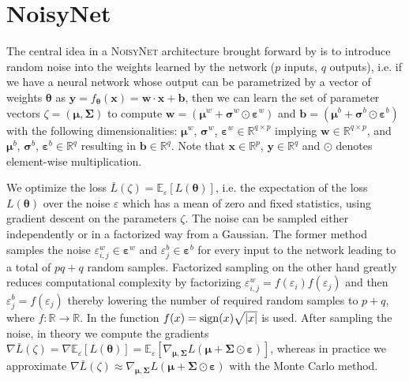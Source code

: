 \clearpage
\hypertarget{link-noisynet}{\section{NoisyNet}}

\noindent The central idea in a \textsc{NoisyNet} architecture brought forward by \cite{noisynet-paper} is to introduce random noise into the weights learned by the network ($p$ inputs, $q$ outputs), i.e. if we have a neural network whose output can be parametrized by a vector of weights $\boldsymbol{\theta}$ as $\textbf{y} = f_{\boldsymbol{\theta}}(\textbf{x}) = \textbf{w} \cdot \textbf{x} + \textbf{b}$, then we can learn the set of parameter vectors $\zeta = (\boldsymbol{\mu}, \boldsymbol{\Sigma})$ to compute $\textbf{w} = (\boldsymbol{\mu}^{w} + \boldsymbol{\sigma}^{w} \odot \boldsymbol{\varepsilon}^{w})$ and $\textbf{b} = (\boldsymbol{\mu}^{b} + \boldsymbol{\sigma}^{b} \odot \boldsymbol{\varepsilon}^{b})$ with the following dimensionalities: $\boldsymbol{\mu}^{w}$, $\boldsymbol{\sigma}^{w}$, $\boldsymbol{\varepsilon}^{w} \in \mathbb{R}^{q \times p}$ implying $\textbf{w} \in \mathbb{R}^{q \times p}$, and $\boldsymbol{\mu}^{b}$, $\boldsymbol{\sigma}^{b}$, $\boldsymbol{\varepsilon}^{b} \in \mathbb{R}^{q}$ resulting in $\textbf{b} \in \mathbb{R}^{q}$. Note that $\textbf{x} \in \mathbb{R}^{p}$, $\textbf{y} \in \mathbb{R}^{q}$ and $\odot$ denotes element-wise multiplication.

\noindent We optimize the loss $\bar{L}(\zeta) = \mathbb{E}_{\varepsilon}[L(\boldsymbol{\theta})]$, i.e. the expectation of the loss $L(\boldsymbol{\theta})$ over the noise $\varepsilon$ which has a mean of zero and fixed statistics, using gradient descent on the parameters $\zeta$. The noise can be sampled either independently or in a factorized way from a Gaussian. The former method samples the noise $\varepsilon^{w}_{i,j} \in \boldsymbol{\varepsilon}^{w}$ and $\varepsilon^{b}_{j} \in \boldsymbol{\varepsilon}^{b}$ for every input to the network leading to a total of $pq + q$ random samples. Factorized sampling on the other hand greatly reduces computational complexity by factorizing $\varepsilon^{w}_{i,j} = f(\varepsilon_{i}) f(\varepsilon_{j})$ and then $\varepsilon^{b}_{j} = f(\varepsilon_{j})$ thereby lowering the number of required random samples to $p + q$, where $f: \mathbb{R} \rightarrow \mathbb{R}$. In \cite{noisynet-paper} the function $f(x) = \operatorname{sign}(x) \sqrt{|x|}$ is used. After sampling the noise, in theory we compute the gradients $\nabla\bar{L}(\zeta) = \nabla\mathbb{E}_{\varepsilon}[L(\boldsymbol{\theta})] = \mathbb{E}_{\varepsilon}[\nabla_{\boldsymbol{\mu}, \boldsymbol{\Sigma}}L(\boldsymbol{\mu} + \boldsymbol{\Sigma} \odot \boldsymbol{\varepsilon})]$, whereas in practice we approximate $\nabla\bar{L}(\zeta) \approx \nabla_{\boldsymbol{\mu}, \boldsymbol{\Sigma}}L(\boldsymbol{\mu} + \boldsymbol{\Sigma} \odot \boldsymbol{\varepsilon})$ with the Monte Carlo method.

